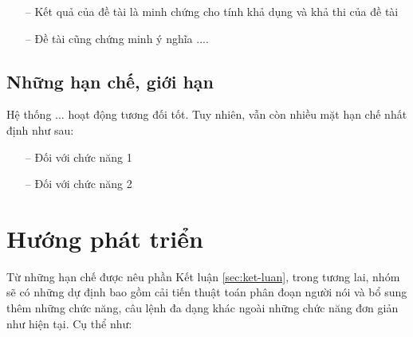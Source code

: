 \begin{itemize}
    \item[--] Kết quả của đề tài là minh chứng cho tính khả dụng và khả thi của đề tài
    \item[--] Đề tài cũng chứng minh ý nghĩa ....
\end{itemize}

\subsection{Những hạn chế, giới hạn}
Hệ thống ... hoạt động tương đối tốt. Tuy nhiên, vẫn còn nhiều mặt hạn chế nhất định như sau:
\begin{itemize}
    \item[--] Đối với chức năng 1
    \item[--] Đối với chức năng 2
\end{itemize}

\section{Hướng phát triển}

Từ những hạn chế được nêu phần Kết luận \ref{sec:ket-luan}, trong tương lai, nhóm sẽ có những dự định bao gồm cải tiến thuật toán phân đoạn người nói và bổ sung thêm những chức năng, câu lệnh đa dạng khác ngoài những chức năng đơn giản như hiện tại. Cụ thể như: